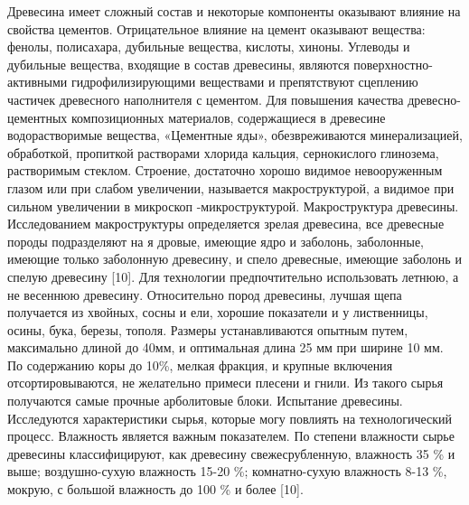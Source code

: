 Древесина имеет сложный состав и некоторые компоненты оказывают влияние
на свойства цементов. Отрицательное влияние на цемент оказывают
вещества: фенолы, полисахара, дубильные вещества, кислоты, хиноны.
Углеводы и дубильные вещества, входящие в состав древесины, являются
поверхностно-активными гидрофилизирующими веществами и препятствуют
сцеплению частичек древесного наполнителя с цементом. Для повышения
качества древесно-цементных композиционных материалов, содержащиеся в
древесине водорастворимые вещества, «Цементные яды», обезвреживаются
минерализацией, обработкой, пропиткой растворами хлорида кальция,
сернокислого глинозема, растворимым стеклом. Строение, достаточно хорошо
видимое невооруженным глазом или при слабом увеличении, называется
макроструктурой, а видимое при сильном увеличении в микроскоп
-микроструктурой. Макроструктура древесины. Исследованием макроструктуры
определяется зрелая древесина, все древесные породы подразделяют на я
дровые, имеющие ядро и заболонь, заболонные, имеющие только заболонную
древесину, и спело древесные, имеющие заболонь и спелую древесину
{[}10{]}. Для технологии предпочтительно использовать летнюю, а не
весеннюю древесину. Относительно пород древесины, лучшая щепа получается
из хвойных, сосны и ели, хорошие показатели и у лиственницы, осины,
бука, березы, тополя. Размеры устанавливаются опытным путем, максимально
длиной до 40мм, и оптимальная длина 25 мм при ширине 10 мм. По
содержанию коры до 10\%, мелкая фракция, и крупные включения
отсортировываются, не желательно примеси плесени и гнили. Из такого
сырья получаются самые прочные арболитовые блоки. Испытание древесины.
Исследуются характеристики сырья, которые могу повлиять на
технологический процесс. Влажность является важным показателем. По
степени влажности сырье древесины классифицируют, как древесину
свежесрубленную, влажность 35 \% и выше; воздушно-сухую влажность 15-20
\%; комнатно-сухую влажность 8-13 \%, мокрую, с большой влажность до 100
\% и более {[}10{]}.


